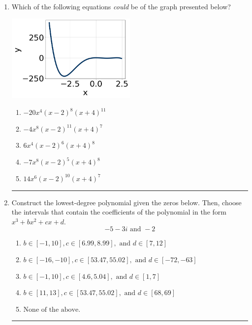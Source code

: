 \documentclass[14pt]{extbook}
\newcommand{\litem}[1]{\item#1\hspace*{-1cm}\rule{\textwidth}{0.4pt}}
\begin{document}
\begin{enumerate}
{\begin{enumerate}[label=\Alph*.]
\end{enumerate} }
\litem{
Which of the following equations \textit{could} be of the graph presented below?
\begin{center}
    \includegraphics[width=0.5\textwidth]{../Figures/polyGraphToFunctionCopyC.png}
\end{center}
\begin{enumerate}[label=\Alph*.]
\item \( -20x^{4} (x - 2)^{8} (x + 4)^{11} \)
\item \( -4x^{8} (x - 2)^{11} (x + 4)^{7} \)
\item \( 6x^{4} (x - 2)^{6} (x + 4)^{8} \)
\item \( -7x^{8} (x - 2)^{5} (x + 4)^{8} \)
\item \( 14x^{6} (x - 2)^{10} (x + 4)^{7} \)

\end{enumerate} }
\litem{
Construct the lowest-degree polynomial given the zeros below. Then, choose the intervals that contain the coefficients of the polynomial in the form $x^3+bx^2+cx+d$.\[ -5 - 3 i \text{ and } -2 \]\begin{enumerate}[label=\Alph*.]
\item \( b \in [-1, 10], c \in [6.99, 8.99], \text{ and } d \in [7, 12] \)
\item \( b \in [-16, -10], c \in [53.47, 55.02], \text{ and } d \in [-72, -63] \)
\item \( b \in [-1, 10], c \in [4.6, 5.04], \text{ and } d \in [1, 7] \)
\item \( b \in [11, 13], c \in [53.47, 55.02], \text{ and } d \in [68, 69] \)
\item \( \text{None of the above.} \)


\end{enumerate}}
\end{enumerate}
\end{document}
